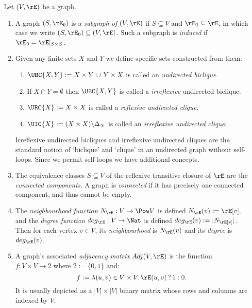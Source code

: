 \documentclass{article}
\begin{document}
\begin{definition}
  \label{def:u_graphs_basic_notions}
  Let $(V,\rE)$ be a graph.
  \begin{enumerate}
  \item
  A graph $(S,\rE_0)$ is a \emph{subgraph of} $(V,\rE)$ if $S \subseteq V$ and $\rE_0 \subseteq \rE$, in which case we write $(S,\rE_0) \subseteq (V,\rE)$. Such a subgraph is \emph{induced} if $\rE_0 = \rE |_{S \times S}$.
  
  \item
  Given any finite sets $X$ and $Y$ we define specific sets constructed from them.
  \begin{enumerate}
  \item
  $\UBC{X,Y} := X \times Y \,\cup\, Y \times X$ is called an \emph{undirected biclique}.
  \item
  If $X \cap Y = \emptyset$ then $\UBC{X,Y}$ is called a \emph{irreflexive} undirected biclique.
  \item
  $\URC{X} := X \times X$ is called a \emph{reflexive undirected clique}.
  \item
  $\UIC{X} := (X \times X) \backslash \Delta_X$ is called an \emph{irreflexive undirected clique}.
  \end{enumerate}
  Irreflexive undirected bicliques and irreflexive undirected cliques are the standard notion of `biclique' and `clique' in an undirected graph without self-loops. Since we permit self-loops we have additional concepts.
  
  \item
  The equivalence classes $S \subseteq V$ of the reflexive transitive closure of $\rE$ are the \emph{connected components}. A graph is \emph{connected} if it has precisely one connected component, and thus cannot be empty.
   
  \item
  The \emph{neighbourhood function} $N_\rE : V \to \Pow V$ is defined $N_\rE(v) := \rE[v]$, and the \emph{degree function} $deg_\rE : V \to \Nat$ is defined $deg_\rE(v) := |N_\rE[v]|$. Then for each vertex $v \in V$, its \emph{neighbourhood} is $N_\rE(v)$ and its \emph{degree} is $deg_\rE(v)$.
  
  \item
  A graph's associated \emph{adjacency matrix} $Adj(V,\rE)$ is the function $f : V \times V \to 2$ where $2 := \{0,1\}$ and:
  \[
  f := \lambda (u,v) \in V \times V.\, \rE(u,v) \, ? \, 1 : 0.
  \]
  It is usually depicted as a $|V| \times |V|$ binary matrix whose rows and columns are indexed by $V$.
  

\end{enumerate}
\end{definition}
\end{document}
